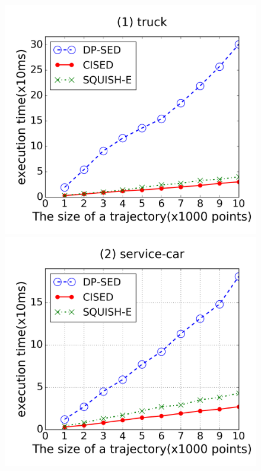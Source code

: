 \begin{figure}[tb!]
\centering
\includegraphics[scale = 0.24]{figures/Exp-time-size-truck.png}
\includegraphics[scale = 0.24]{figures/Exp-time-size-service.png}

\end{figure}
